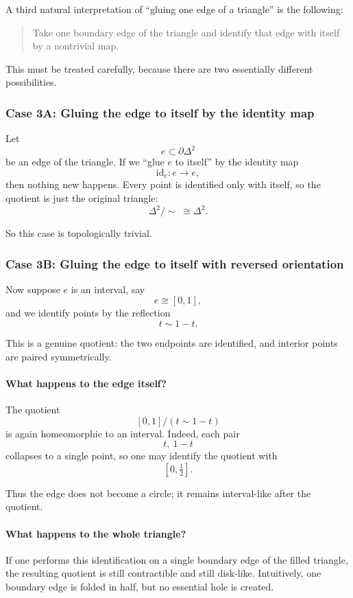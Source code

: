 \documentclass[12pt,a4paper]{article}
\theoremstyle{notespace}
\begin{document}
A third natural interpretation of ``gluing one edge of a triangle'' is the following:

\begin{quote}
	Take one boundary edge of the triangle and identify that edge with itself by a nontrivial map.
\end{quote}

This must be treated carefully, because there are two essentially different possibilities.

\subsubsection{Case 3A: Gluing the edge to itself by the identity map}

Let
\[
e\subset \partial \Delta^2
\]
be an edge of the triangle. If we ``glue \(e\) to itself'' by the identity map
\[
\mathrm{id}_e:e\to e,
\]
then nothing new happens. Every point is identified only with itself, so the quotient is just the original triangle:
\[
\Delta^2/\!\sim \;\cong \Delta^2.
\]

So this case is topologically trivial.

\subsubsection{Case 3B: Gluing the edge to itself with reversed orientation}

Now suppose \(e\) is an interval, say
\[
e\cong [0,1],
\]
and we identify points by the reflection
\[
t\sim 1-t.
\]

This is a genuine quotient: the two endpoints are identified, and interior points are paired symmetrically.

\paragraph{What happens to the edge itself?}
The quotient
\[
[0,1]/(t\sim 1-t)
\]
is again homeomorphic to an interval. Indeed, each pair
\[
t,\ 1-t
\]
collapses to a single point, so one may identify the quotient with
\[
[0,\tfrac12].
\]

Thus the edge does not become a circle; it remains interval-like after the quotient.

\paragraph{What happens to the whole triangle?}
If one performs this identification on a single boundary edge of the filled triangle, the resulting quotient is still contractible and still disk-like. Intuitively, one boundary edge is folded in half, but no essential hole is created.
\end{document}
